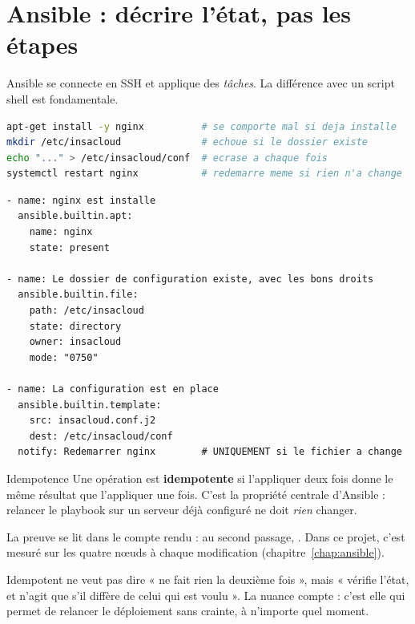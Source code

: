 \section{Ansible : décrire l'état, pas les étapes}

Ansible se connecte en SSH et applique des \emph{tâches}. La différence avec un
script shell est fondamentale.

\begin{lstlisting}[language=bash,caption={Un script shell décrit des actions}]
apt-get install -y nginx          # se comporte mal si deja installe
mkdir /etc/insacloud              # echoue si le dossier existe
echo "..." > /etc/insacloud/conf  # ecrase a chaque fois
systemctl restart nginx           # redemarre meme si rien n'a change
\end{lstlisting}

\begin{lstlisting}[language=yamlplus,caption={Ansible décrit un état voulu}]
- name: nginx est installe
  ansible.builtin.apt:
    name: nginx
    state: present

- name: Le dossier de configuration existe, avec les bons droits
  ansible.builtin.file:
    path: /etc/insacloud
    state: directory
    owner: insacloud
    mode: "0750"

- name: La configuration est en place
  ansible.builtin.template:
    src: insacloud.conf.j2
    dest: /etc/insacloud/conf
  notify: Redemarrer nginx        # UNIQUEMENT si le fichier a change
\end{lstlisting}

\begin{notion}{Idempotence}
Une opération est \textbf{idempotente} si l'appliquer deux fois donne le même
résultat que l'appliquer une fois. C'est la propriété centrale d'Ansible :
relancer le playbook sur un serveur déjà configuré ne doit \emph{rien} changer.

La preuve se lit dans le compte rendu : au second passage, .
Dans ce projet, c'est mesuré sur les quatre nœuds à chaque modification
(chapitre~\ref{chap:ansible}).
\end{notion}

\begin{retenir}
Idempotent ne veut pas dire « ne fait rien la deuxième fois », mais « vérifie
l'état, et n'agit que s'il diffère de celui qui est voulu ». La nuance compte :
c'est elle qui permet de relancer le déploiement sans crainte, à n'importe quel
moment.
\end{retenir}

